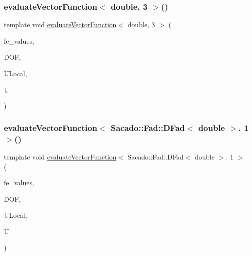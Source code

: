 \subsubsection{\texorpdfstring{evaluateVectorFunction$<$ double, 3 $>$()}{evaluateVectorFunction< double, 3 >()}}
{\footnotesize\ttfamily template void \mbox{\hyperlink{group___evaluation_functions_gab9e164be1be244df81c932426a4bd513}{evaluate\+Vector\+Function}}$<$ double, 3 $>$ (\begin{DoxyParamCaption}\item[{const F\+E\+Values$<$ 3 $>$ \&}]{fe\+\_\+values,  }\item[{unsigned int}]{D\+OF,  }\item[{Table$<$ 1, double $>$ \&}]{U\+Local,  }\item[{Table$<$ 2, double $>$ \&}]{U }\end{DoxyParamCaption})}

\mbox{\label{function_evaluations_8cc_a668c45fc65b525a83192a67dd35571c6}} 
\subsubsection{\texorpdfstring{evaluateVectorFunction$<$ Sacado::Fad::DFad$<$ double $>$, 1 $>$()}{evaluateVectorFunction< Sacado::Fad::DFad< double >, 1 >()}}
{\footnotesize\ttfamily template void \mbox{\hyperlink{group___evaluation_functions_gab9e164be1be244df81c932426a4bd513}{evaluate\+Vector\+Function}}$<$ Sacado\+::\+Fad\+::\+D\+Fad$<$ double $>$, 1 $>$ (\begin{DoxyParamCaption}\item[{const F\+E\+Values$<$ 1 $>$ \&}]{fe\+\_\+values,  }\item[{unsigned int}]{D\+OF,  }\item[{Table$<$ 1, Sacado\+::\+Fad\+::\+D\+Fad$<$ double $>$$>$ \&}]{U\+Local,  }\item[{Table$<$ 2, Sacado\+::\+Fad\+::\+D\+Fad$<$ double $>$$>$ \&}]{U }\end{DoxyParamCaption})}

\mbox{\label{function_evaluations_8cc_a28ceac224510d9b9753dbe934874d56b}} 
